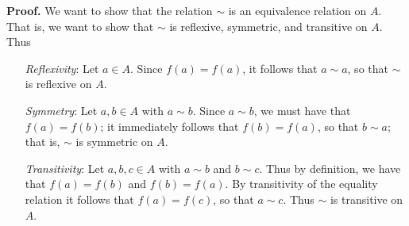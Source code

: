 \begin{enumerate}
      \textbf{Proof.} We want to show that the relation $\sim$ is an equivalence
      relation on $A$. That is, we want to show that $\sim$ is reflexive,
      symmetric, and transitive on $A$. Thus
      \begin{enumerate}
         \item[\textit{Reflexivity}:]  Let $a \in A$. Since $f(a) = f(a)$, it
                                       follows that $a \sim a$, so that $\sim$ 
                                       is reflexive on $A$.
         \item[\textit{Symmetry}:]     Let $a, b \in A$ with $a \sim b$. Since
                                       $a \sim b$, we must have that
                                       $f(a) = f(b)$; it immediately follows    
                                       that $f(b) = f(a)$, so that $b \sim a$;
                                       that is, $\sim$ is symmetric on $A$.
         \item[\textit{Transitivity}:] Let $a, b, c \in A$ with $a \sim b$ and
                                       $b \sim c$. Thus by definition, we have
                                       that $f(a) = f(b)$ and $f(b) = f(a)$. By
                                       transitivity of the equality relation it
                                       follows that $f(a) = f(c)$, so that
                                       $a \sim c$. Thus $\sim$ is transitive on
                                       $A$.
      \end{enumerate}


\end{enumerate}
